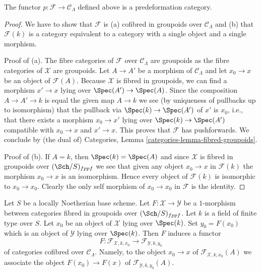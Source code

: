\begin{lemma}
\label{lemma-predeformation-category}
The functor $p : \mathcal{F} \to \mathcal{C}_\Lambda$ defined above
is a predeformation category.
\end{lemma}

\begin{proof}
We have to show that $\mathcal{F}$ is (a) cofibred in groupoids over
$\mathcal{C}_\Lambda$ and (b) that $\mathcal{F}(k)$ is a category equivalent
to a category with a single object and a single morphism.

\medskip\noindent
Proof of (a). The fibre categories of $\mathcal{F}$
over $\mathcal{C}_\Lambda$ are groupoids as the fibre categories
of $\mathcal{X}$ are groupoids. Let $A \to A'$ be a morphism of
$\mathcal{C}_\Lambda$ and let $x_0 \to x$ be an object of $\mathcal{F}(A)$.
Because $\mathcal{X}$ is fibred in groupoids, we can find a morphism
$x' \to x$ lying over $\Spec(A') \to \Spec(A)$. Since the composition
$A \to A' \to k$ is equal the given map $A \to k$ we see (by uniqueness
of pullbacks up to isomorphism) that the pullback via $\Spec(k) \to \Spec(A')$
of $x'$ is $x_0$, i.e., that there exists a morphism $x_0 \to x'$
lying over $\Spec(k) \to \Spec(A')$ compatible with
$x_0 \to x$ and $x' \to x$. This proves that $\mathcal{F}$ has
pushforwards. We conclude by (the dual of)
Categories, Lemma \ref{categories-lemma-fibred-groupoids}.

\medskip\noindent
Proof of (b). If $A = k$, then $\Spec(k) = \Spec(A)$ and since $\mathcal{X}$
is fibred in groupoids over $(\Sch/S)_{fppf}$ we see that given any object
$x_0 \to x$ in $\mathcal{F}(k)$ the morphism $x_0 \to x$ is an isomorphism.
Hence every object of $\mathcal{F}(k)$ is isomorphic to $x_0 \to x_0$.
Clearly the only self morphism of $x_0 \to x_0$ in $\mathcal{F}$ is
the identity.
\end{proof}

\noindent
Let $S$ be a locally Noetherian base scheme. Let
$F : \mathcal{X} \to \mathcal{Y}$ be a $1$-morphism between categories
fibred in groupoids over $(\Sch/S)_{fppf}$. Let $k$ is a field
of finite type over $S$. Let $x_0$ be an object of $\mathcal{X}$ lying
over $\Spec(k)$. Set $y_0 = F(x_0)$ which is an object of $\mathcal{Y}$
lying over $\Spec(k)$. Then $F$ induces a functor
\begin{equation}
\label{equation-functoriality}
F :
\mathcal{F}_{\mathcal{X}, k, x_0}
\longrightarrow
\mathcal{F}_{\mathcal{Y}, k, y_0}
\end{equation}
of categories cofibred over $\mathcal{C}_\Lambda$. Namely, to the object
$x_0 \to x$ of $\mathcal{F}_{\mathcal{X}, k, x_0}(A)$ we associate
the object $F(x_0) \to F(x)$ of $\mathcal{F}_{\mathcal{Y}, k, y_0}(A)$.

